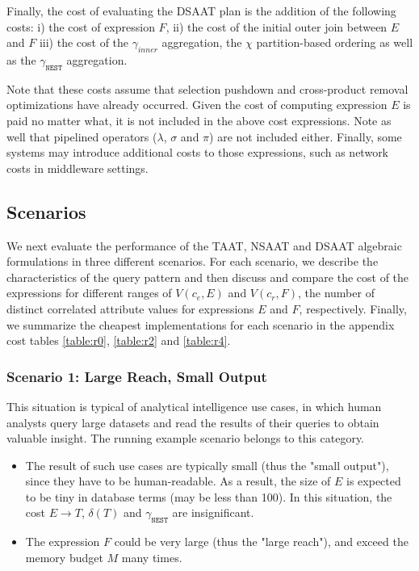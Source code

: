 Finally, the cost of evaluating the DSAAT plan is the addition of the following costs: i) the cost of expression $F$, ii) the cost of the initial outer join between $E$ and $F$ iii) the cost of the $\gamma_{inner}$ aggregation, the $\chi$ partition-based ordering as well as the $\gamma_{\texttt{NEST}}$ aggregation.

Note that these costs assume that selection pushdown and cross-product removal optimizations have already occurred. Given the cost of computing expression $E$ is paid no matter what, it is not included in the above cost expressions. Note as well that pipelined operators ($\lambda$, $\sigma$ and $\pi$) are not included either. Finally, some systems may introduce additional costs to those expressions, such as network costs in middleware settings.

\subsection{Scenarios}

We next evaluate the performance of the TAAT, NSAAT and DSAAT algebraic formulations in three different scenarios.  For each scenario, we describe the characteristics of the query pattern and then discuss and compare the cost of the expressions for different ranges of $V(c_e,E)$ and $V(c_r,F)$, the number of distinct correlated attribute values for expressions $E$ and $F$, respectively. Finally, we summarize the cheapest implementations for each scenario in the appendix cost tables \ref{table:r0}, \ref{table:r2} and \ref{table:r4}.

\subsubsection{Scenario 1: Large Reach, Small Output}

This situation is typical of analytical intelligence use cases, in which human analysts query large datasets and read the results of their queries to obtain valuable insight. The running example scenario belongs to this category. 

\begin{itemize}
\item{The result of such use cases are typically small (thus the "small output"), since they have to be human-readable. As a result, the size of $E$ is expected to be tiny in database terms (may be less than 100). In this situation, the cost $E \rightarrow T$, $\delta(T)$ and $\gamma_{\texttt{NEST}}$ are insignificant.}
\item {The expression $F$ could be very large (thus the "large reach"), and exceed the memory budget $M$ many times.}
\end{itemize}

